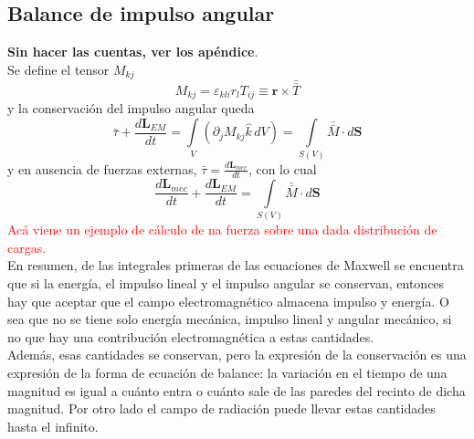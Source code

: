 \subsection{Balance de impulso angular}
\textbf{Sin hacer las cuentas, ver los apéndice}.\\
\indent Se define el tensor $M_{kj}$
\begin{equation*}
    M_{kj} = \varepsilon_{kli}r_{l}T_{ij}
    \equiv \textbf{r}\times \bar{\bar{T}}
\end{equation*}
y la conservación del impulso angular queda
\begin{equation*}
    \bar{\tau} + \frac{d\textbf{L}_{EM}}{dt}
    = 
    \int\limits_{V}
    \left(
        \partial_{j}M_{kj}\hat{k}\,dV
    \right)
    =
    \int\limits_{S(V)} \bar{\bar{M}}\cdot d\textbf{S}
\end{equation*}
y en ausencia de fuerzas externas, $\bar{\tau} = \frac{d\textbf{L}_{mec}}{dt}$, con lo cual
\begin{equation*}
    \frac{d\textbf{L}_{mec}}{dt}
    + \frac{d\textbf{L}_{EM}}{dt}
    = \int\limits_{S(V)}\bar{\bar{M}}\cdot d\textbf{S}
\end{equation*}
\textcolor{red}{Acá viene un ejemplo de cálculo de na fuerza sobre una dada distribución de cargas.}\\
\indent En resumen, de las integrales primeras de las ecuaciones de Maxwell se encuentra que si la energía, el impulso lineal y el impulso angular se conservan, entonces hay que aceptar que el campo electromagnético almacena impulso y energía. O sea que no se tiene solo energía mecánica, impulso lineal y angular mecánico, si no que hay una contribución electromagnética a estas cantidades.\\
\indent Además, esas cantidades se conservan, pero la expresión de la conservación es una expresión de la forma de ecuación de balance: la variación en el tiempo de una magnitud es igual a cuánto entra o cuánto sale de las paredes del recinto de dicha magnitud. Por otro lado el campo de radiación puede llevar estas cantidades hasta el infinito.



